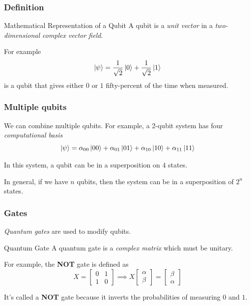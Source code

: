 \documentclass{beamer}
\begin{document}
  \begin{frame}
    \frametitle{Definition}
    \begin{block}{Mathematical Representation of a Qubit}
      A qubit is a \textit{unit vector} in a \textit{two-dimensional complex vector field}.
    \end{block}

    For example
    \begin{equation*}
      \ket\psi = \frac1{\sqrt 2}\ket0 + \frac1{\sqrt 2}\ket1
    \end{equation*}
    is a qubit that gives either $0$ or $1$ fifty-percent of the time when measured.
  \end{frame}
  \begin{frame}
    \frametitle{Multiple qubits}
    We can combine multiple qubits. For example, a 2-qubit system has four \textit{computational basis}
    \begin{equation*}
      \ket\psi = \alpha_{00}\ket{00} + \alpha_{01}\ket{01} + \alpha_{10}\ket{10} + \alpha_{11}\ket{11}
    \end{equation*}

    In this system, a qubit can be in a superposition on $4$ states.

    In general, if we have $n$ qubits, then the system can be in a superposition of $2^n$ states.
  \end{frame}
  \begin{frame}
    \frametitle{Gates}
    \textit{Quantum gates} are used to modify qubits.
    \begin{block}{Quantum Gate}
      A quantum gate is a \textit{complex matrix} which must be unitary.
    \end{block}

    For example, the \textbf{NOT} gate is defined as
    \begin{equation*}
      X = \begin{bmatrix}
        0 & 1 \\ 1 & 0
      \end{bmatrix}
      \implies
      X\begin{bmatrix}
        \alpha \\ \beta
      \end{bmatrix}
      = \begin{bmatrix}
        \beta \\ \alpha
      \end{bmatrix}
    \end{equation*}

    It's called a \textbf{NOT} gate because it inverts the probabilities of measuring $0$ and $1$.
  \end{frame}
\end{document}
